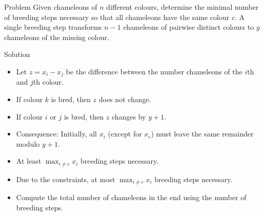 \begin{slide}
	\begin{block}{Problem}
		Given chameleons of $n$ different colours, determine the minimal number of breeding steps necessary so that all chameleons have the same colour $c$. A single breeding step transforms $n-1$ chameleons of pairwise distinct colours to $y$ chameleons of the missing colour.
	\end{block}
\end{slide}


\begin{slide}
	\begin{block}{Solution}
		\begin{itemize}
			\item Let $z = x_i - x_j$ be the difference between the number chameleons of the $i$th and $j$th colour.
			\item If colour $k$ is bred, then $z$ does not change.
			\item If colour $i$ or $j$ is bred, then $z$ changes by $y+1$.
			\item Consequence: Initially, all $x_i$ (except for $x_c$) must leave the same remainder modulo $y+1$.
			\item At least $\max_{i \not= c} x_i$ breeding steps necessary.
			\item Due to the constraints, at most $\max_{i \not= c} x_i$ breeding steps necessary.
			\item Compute the total number of chameleons in the end using the number of breeding steps.
		\end{itemize}
	\end{block}
\end{slide}

